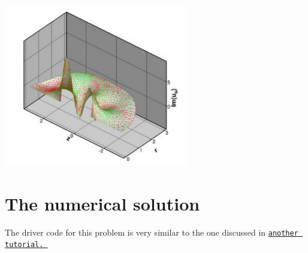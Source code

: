  
\begin{DoxyImage}
\includegraphics[width=0.6\textwidth]{im}
\end{DoxyImage}




 

\hypertarget{index_num_soln}{}\section{The numerical solution}\label{index_num_soln}
The driver code for this problem is very similar to the one discussed in \href{../../sphere_scattering/html/index.html}{\tt another tutorial. }

